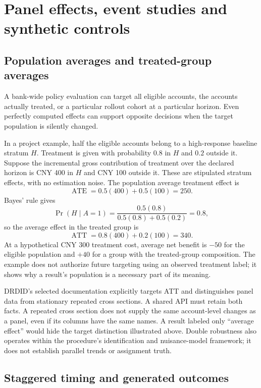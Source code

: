 \chapter{Panel effects, event studies and synthetic controls}
\label{sw:panels}

\section{Population averages and treated-group averages}

A bank-wide policy evaluation can target all eligible accounts, the accounts
actually treated, or a particular rollout cohort at a particular horizon.
Even perfectly computed effects can support opposite decisions when the target
population is silently changed.

In a project example, half the eligible accounts belong to a high-response
baseline stratum \(H\). Treatment is given with probability \(0.8\) in \(H\)
and \(0.2\) outside it. Suppose the incremental gross contribution of treatment
over the declared horizon is CNY 400 in \(H\) and CNY 100 outside it. These
are stipulated stratum effects, with no estimation noise. The population
average treatment effect is
\[
 \operatorname{ATE}=0.5(400)+0.5(100)=250.
\]
Bayes' rule gives
\[
 \Pr(H\mid A=1)
 =\frac{0.5(0.8)}{0.5(0.8)+0.5(0.2)}=0.8,
\]
so the average effect in the treated group is
\[
 \operatorname{ATT}=0.8(400)+0.2(100)=340.
\]
At a hypothetical CNY 300 treatment cost, average net benefit is \(-50\)
for the eligible population and \(+40\) for a group with the treated-group
composition. The example does not authorize future targeting using an observed
treatment label; it shows why a result's population is a necessary part of its
meaning.

DRDID's selected documentation explicitly targets ATT and distinguishes panel
data from stationary repeated cross sections. A shared API must retain both
facts. A repeated cross section does not supply the same account-level changes
as a panel, even if its columns have the same names. A result labeled only
``average effect'' would hide the target distinction illustrated above.
Double robustness also operates within the procedure's identification and
nuisance-model framework; it does not establish parallel trends or assignment
truth.\cite{drdid}

\section{Staggered timing and generated outcomes}

